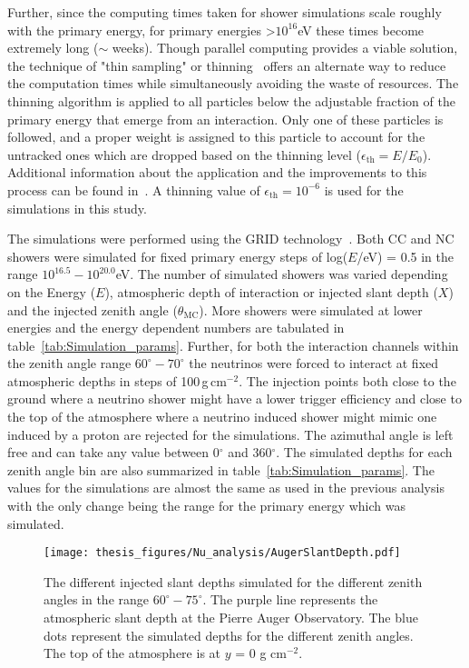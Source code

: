 Further, since the computing times taken for shower simulations scale roughly with the primary energy, for primary energies >$10^{16}$eV these times become extremely long ($\sim$ weeks). Though parallel computing provides a viable solution, the technique of "thin sampling" or thinning~\cite{Hillas:1997tf} offers an alternate way to reduce the computation times while simultaneously avoiding the waste of resources. The thinning algorithm is applied to all particles below the adjustable fraction of the primary energy that emerge from an interaction. Only one of these particles is followed, and a proper weight is assigned to this particle to account for the untracked ones which are dropped based on the thinning level ($\epsilon_{\text{th}} = E/E_0$). Additional information about the application and the improvements to this process can be found in~\cite{Heck:1998gr,Kobal:2001jx}. A thinning value of $\epsilon_{\text{th}} = 10^{-6}$ is used for the simulations in this study.


The simulations were performed using the GRID technology~\cite{GRID_tech,LozanoBahilo:2012pe}. Both CC and NC showers were simulated for fixed primary energy steps of log($E$/eV) = 0.5 in the range $10^{16.5}-10^{20.0}$eV. The number of simulated showers was varied depending on the Energy ($E$), atmospheric depth of interaction or injected slant depth ($X$) and the injected zenith angle ($\theta_{\text{MC}}$). More showers were simulated at lower energies and the energy dependent numbers are tabulated in table~\ref{tab:Simulation_params}. Further, for both the interaction channels within the zenith angle range $60^{\circ}-70^{\circ}$ the neutrinos were forced to interact at fixed atmospheric depths in steps of 100\,g\,cm$^{-2}$. The injection points both close to the ground where a neutrino shower might have a lower trigger efficiency and close to the top of the atmosphere where a neutrino induced shower might mimic one induced by a proton are rejected for the simulations. The azimuthal angle is left free and can take any value between 0$^{\circ}$ and 360$^{\circ}$. The simulated depths for each zenith angle bin are also summarized in table~\ref{tab:Simulation_params}. The values for the simulations are almost the same as used in the previous analysis~\cite{gap_note_2013} with the only change being the range for the primary energy which was simulated.

\begin{figure}[t!]
  \centering
  \texttt{[image: thesis\_figures/Nu\_analysis/AugerSlantDepth.pdf]}
  \caption{The different injected slant depths simulated for the different zenith angles in the range $60^{\circ}-75^{\circ}$. The purple line represents the atmospheric slant depth at the Pierre Auger Observatory. The blue dots represent the simulated depths for the different zenith angles. The top of the atmosphere is at $y$ = 0 g cm$^{-2}$.}
  \label{fig:Salant_depth_sim}
\end{figure}

